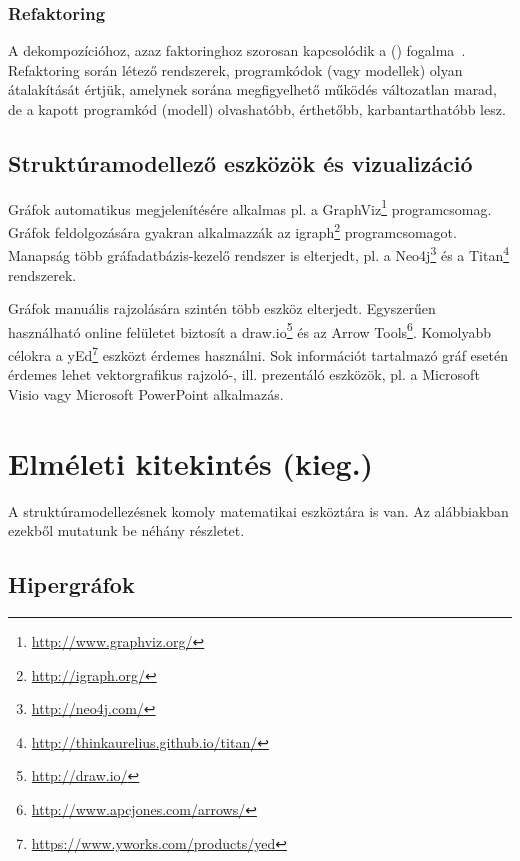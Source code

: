 \subsubsection{Refaktoring}

A dekompozícióhoz, azaz faktoringhoz szorosan kapcsolódik a  () fogalma~\cite{fowler2012refactoring}. Refaktoring során létező rendszerek, programkódok (vagy modellek) olyan átalakítását értjük, amelynek sorána megfigyelhető működés változatlan marad, de a kapott programkód (modell) olvashatóbb, érthetőbb, karbantarthatóbb lesz.

\subsection{Struktúramodellező eszközök és vizualizáció}

Gráfok automatikus megjelenítésére alkalmas pl. a GraphViz\footnote{\url{http://www.graphviz.org/}} programcsomag. Gráfok feldolgozására gyakran alkalmazzák az igraph\footnote{\url{http://igraph.org/}} programcsomagot. Manapság több gráfadatbázis-kezelő rendszer is elterjedt, pl. a Neo4j\footnote{\url{http://neo4j.com/}} és a Titan\footnote{\url{http://thinkaurelius.github.io/titan/}} rendszerek.

Gráfok manuális rajzolására szintén több eszköz elterjedt. Egyszerűen használható online felületet biztosít a draw.io\footnote{\url{http://draw.io/}} és az Arrow Tools\footnote{\url{http://www.apcjones.com/arrows/}}. Komolyabb célokra a yEd\footnote{\url{https://www.yworks.com/products/yed}} eszközt érdemes használni. Sok információt tartalmazó gráf esetén érdemes lehet vektorgrafikus rajzoló-, ill. prezentáló eszközök, pl. a Microsoft Visio vagy Microsoft PowerPoint alkalmazás.


\section{Elméleti kitekintés (kieg.)}

A struktúramodellezésnek komoly matematikai eszköztára is van. Az alábbiakban ezekből mutatunk be néhány részletet.

\subsection{Hipergráfok}

